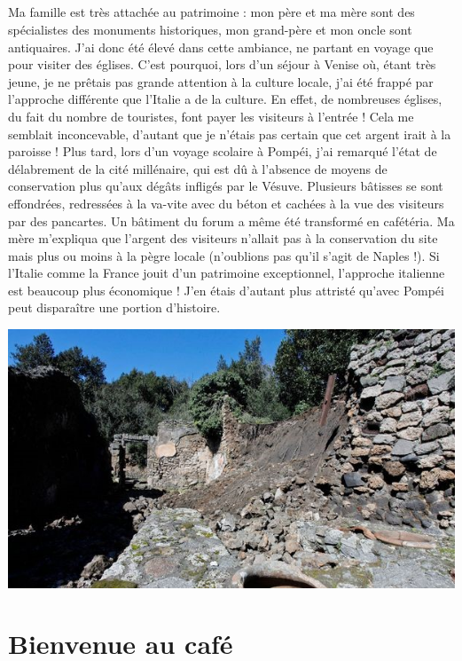 \paragraph{}
Ma famille est très attachée au patrimoine : mon père et ma mère sont des spécialistes des monuments historiques, mon grand-père et mon oncle sont antiquaires. J’ai donc été élevé dans cette ambiance, ne partant en voyage que pour visiter des églises. C’est pourquoi, lors d’un séjour à Venise où, étant très jeune, je ne prêtais pas grande attention à la culture locale, j’ai été frappé par l’approche différente que l’Italie a de la culture. En effet, de nombreuses églises, du fait du nombre de touristes, font payer les visiteurs à l’entrée ! Cela me semblait inconcevable, d’autant que je n’étais pas certain que cet argent irait à la paroisse ! Plus tard, lors d’un voyage scolaire à Pompéi, j’ai remarqué l’état de délabrement de la cité millénaire, qui est dû à l’absence de moyens de conservation plus qu’aux dégâts infligés par le Vésuve. Plusieurs bâtisses se sont effondrées, redressées à la va-vite avec du béton et cachées à la vue des visiteurs par des pancartes. Un bâtiment du forum a même été transformé en cafétéria. Ma mère m’expliqua que l’argent des visiteurs n’allait pas à la conservation du site mais plus ou moins à la pègre locale (n’oublions pas qu’il s’agit de Naples !). Si l’Italie comme la France jouit d’un patrimoine exceptionnel, l’approche italienne est beaucoup plus économique ! J’en étais d’autant plus attristé qu’avec Pompéi peut disparaître une portion d’histoire.
\begin{center}
\includegraphics[scale=0.5]{Pompei.jpg}
\end{center}


\chapter{Bienvenue au café}
